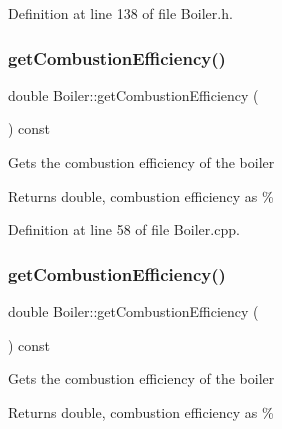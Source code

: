 Definition at line 138 of file Boiler.\+h.

\mbox{\label{class_boiler_a21c7423b756761c3216704b3f554feff}} 
\subsubsection{\texorpdfstring{get\+Combustion\+Efficiency()}{getCombustionEfficiency()}\hspace{0.1cm}{\footnotesize\ttfamily [1/3]}}
{\footnotesize\ttfamily double Boiler\+::get\+Combustion\+Efficiency (\begin{DoxyParamCaption}{ }\end{DoxyParamCaption}) const}

Gets the combustion efficiency of the boiler \begin{DoxyReturn}{Returns}
double, combustion efficiency as \% 
\end{DoxyReturn}


Definition at line 58 of file Boiler.\+cpp.

\mbox{\label{class_boiler_a21c7423b756761c3216704b3f554feff}} 
\subsubsection{\texorpdfstring{get\+Combustion\+Efficiency()}{getCombustionEfficiency()}\hspace{0.1cm}{\footnotesize\ttfamily [2/3]}}
{\footnotesize\ttfamily double Boiler\+::get\+Combustion\+Efficiency (\begin{DoxyParamCaption}{ }\end{DoxyParamCaption}) const}

Gets the combustion efficiency of the boiler \begin{DoxyReturn}{Returns}
double, combustion efficiency as \% 
\end{DoxyReturn}
\mbox{\label{class_boiler_a21c7423b756761c3216704b3f554feff}} 
